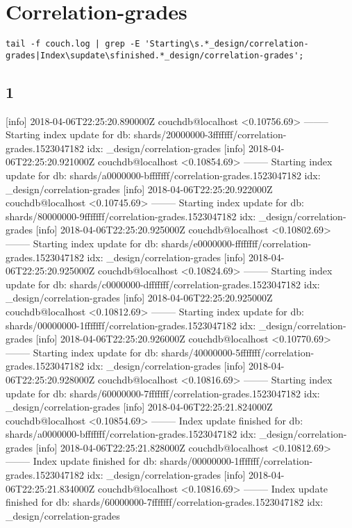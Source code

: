 \section{Correlation-grades}
\begin{verbatim}
tail -f couch.log | grep -E 'Starting\s.*_design/correlation-grades|Index\supdate\sfinished.*_design/correlation-grades';
\end{verbatim}

\subsection{1}
[info] 2018-04-06T22:25:20.890000Z couchdb@localhost <0.10756.69> -------- Starting index update for db: shards/20000000-3fffffff/correlation-grades.1523047182 idx: _design/correlation-grades
[info] 2018-04-06T22:25:20.921000Z couchdb@localhost <0.10854.69> -------- Starting index update for db: shards/a0000000-bfffffff/correlation-grades.1523047182 idx: _design/correlation-grades
[info] 2018-04-06T22:25:20.922000Z couchdb@localhost <0.10745.69> -------- Starting index update for db: shards/80000000-9fffffff/correlation-grades.1523047182 idx: _design/correlation-grades
[info] 2018-04-06T22:25:20.925000Z couchdb@localhost <0.10802.69> -------- Starting index update for db: shards/e0000000-ffffffff/correlation-grades.1523047182 idx: _design/correlation-grades
[info] 2018-04-06T22:25:20.925000Z couchdb@localhost <0.10824.69> -------- Starting index update for db: shards/c0000000-dfffffff/correlation-grades.1523047182 idx: _design/correlation-grades
[info] 2018-04-06T22:25:20.925000Z couchdb@localhost <0.10812.69> -------- Starting index update for db: shards/00000000-1fffffff/correlation-grades.1523047182 idx: _design/correlation-grades
[info] 2018-04-06T22:25:20.926000Z couchdb@localhost <0.10770.69> -------- Starting index update for db: shards/40000000-5fffffff/correlation-grades.1523047182 idx: _design/correlation-grades
[info] 2018-04-06T22:25:20.928000Z couchdb@localhost <0.10816.69> -------- Starting index update for db: shards/60000000-7fffffff/correlation-grades.1523047182 idx: _design/correlation-grades
[info] 2018-04-06T22:25:21.824000Z couchdb@localhost <0.10854.69> -------- Index update finished for db: shards/a0000000-bfffffff/correlation-grades.1523047182 idx: _design/correlation-grades
[info] 2018-04-06T22:25:21.828000Z couchdb@localhost <0.10812.69> -------- Index update finished for db: shards/00000000-1fffffff/correlation-grades.1523047182 idx: _design/correlation-grades
[info] 2018-04-06T22:25:21.834000Z couchdb@localhost <0.10816.69> -------- Index update finished for db: shards/60000000-7fffffff/correlation-grades.1523047182 idx: _design/correlation-grades
